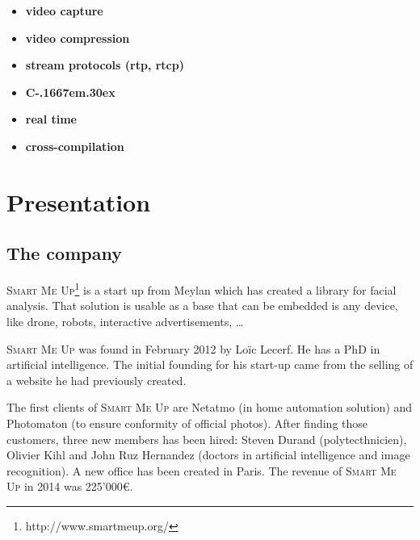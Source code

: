 \documentclass[a4paper,11pt]{custom}
\newcommand{\smu}{\textsc{Smart Me Up}}
\newcommand{\cpp}{%
  C\kern-.1667em\raise.30ex\hbox{\smaller{++}\xspace}%
  \spacefactor1000%
}
\begin{document}
\begin{multicols}{2}
\begin{itemize}
\item \textbf{video capture}
\item \textbf{video compression}
\item \textbf{stream protocols (rtp, rtcp)}
\item \textbf{\cpp}
\item \textbf{real time}
\item \textbf{cross-compilation}
\end{itemize}
\end{multicols}

\newpage

%
\headerleftcontent{\headerlefttext}%
\headerrightcontent{\headerrighttext}%

\tableofcontents

\clearpage

\chapter{Presentation}


\section{The company}

\smu{}\footnote{http://www.smartmeup.org/} is a start up from Meylan which has
created a library for facial
analysis. That solution is usable as a base that can be embedded is any device,
like drone, robots, interactive advertisements, …

\smu{} was found in February 2012 by Loïc Lecerf. He has a PhD in artificial
intelligence. The initial founding for his start-up came from the selling of
a website he had previously created.

The first clients of \smu{} are Netatmo (in home automation solution) and Photomaton (to
ensure conformity of official photos). After finding those customers, three new
members has been hired: Steven Durand (polytecthnicien), Olivier Kihl and John
Ruz Hernandez (doctors in artificial intelligence and image recognition). A new
office has been created in Paris. The revenue of \smu{} in 2014 was 225'000\euro.
\end{document}
